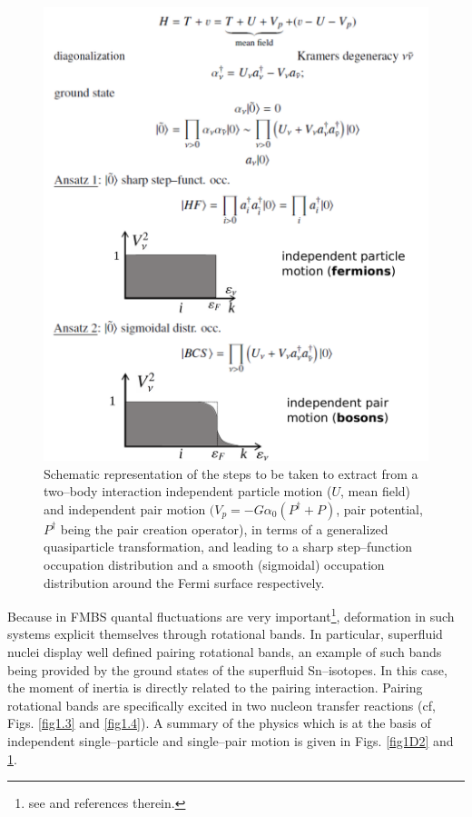 \begin{figure}\centerline{\includegraphics*[width=\textwidth,angle=0]{nutshell/figs/fig1D3.pdf}}
\caption{Schematic representation of the steps to be taken to extract from a two--body interaction independent particle motion ($U$, mean field) and independent pair motion $(V_p=-G\alpha_0(P^\dagger+P)$, pair potential, $P^\dagger$ being the pair creation operator), in terms of a generalized quasiparticle transformation, and leading to a sharp step--function occupation distribution and a smooth (sigmoidal) occupation distribution around the Fermi surface respectively.}\label{fig1D3}
\end{figure}




Because in FMBS  quantal fluctuations are very important\footnote{see \cite{Bertsch:05} and references therein.}, deformation in such systems explicit themselves through rotational bands. In particular, superfluid nuclei display well defined pairing rotational bands, an example of such bands being provided by the ground states of the superfluid Sn--isotopes. In this case, the moment of inertia is directly related to the  pairing interaction. Pairing  rotational bands are specifically excited in two nucleon transfer reactions (cf, Figs. \ref{fig1.3} and \ref{fig1.4}). 
A summary of the physics which is at the basis of independent single--particle and single--pair motion is given in Figs. \ref{fig1D2} and \ref{fig1D3}. 




